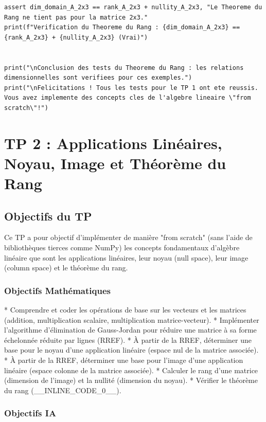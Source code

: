 \documentclass{report}
\begin{document}
\begin{verbatim}
assert dim_domain_A_2x3 == rank_A_2x3 + nullity_A_2x3, "Le Theoreme du Rang ne tient pas pour la matrice 2x3."
print(f"Verification du Theoreme du Rang : {dim_domain_A_2x3} == {rank_A_2x3} + {nullity_A_2x3} (Vrai)")


print("\nConclusion des tests du Theoreme du Rang : les relations dimensionnelles sont verifiees pour ces exemples.")
print("\nFelicitations ! Tous les tests pour le TP 1 ont ete reussis. Vous avez implemente des concepts cles de l'algebre lineaire \"from scratch\"!")
\end{verbatim}

\newpage
\chapter*{TP 2 : Applications Linéaires, Noyau, Image et Théorème du Rang}

\section*{Objectifs du TP}

Ce TP a pour objectif d'implémenter de manière "from scratch" (sans l'aide de bibliothèques tierces comme NumPy) les concepts fondamentaux d'algèbre linéaire que sont les applications linéaires, leur noyau (null space), leur image (column space) et le théorème du rang.

\subsection*{Objectifs Mathématiques}

*   Comprendre et coder les opérations de base sur les vecteurs et les matrices (addition, multiplication scalaire, multiplication matrice-vecteur).
*   Implémenter l'algorithme d'élimination de Gauss-Jordan pour réduire une matrice à sa forme échelonnée réduite par lignes (RREF).
*   À partir de la RREF, déterminer une base pour le noyau d'une application linéaire (espace nul de la matrice associée).
*   À partir de la RREF, déterminer une base pour l'image d'une application linéaire (espace colonne de la matrice associée).
*   Calculer le rang d'une matrice (dimension de l'image) et la nullité (dimension du noyau).
*   Vérifier le théorème du rang (\_\_INLINE\_CODE\_0\_\_).

\subsection*{Objectifs IA}
\end{document}
